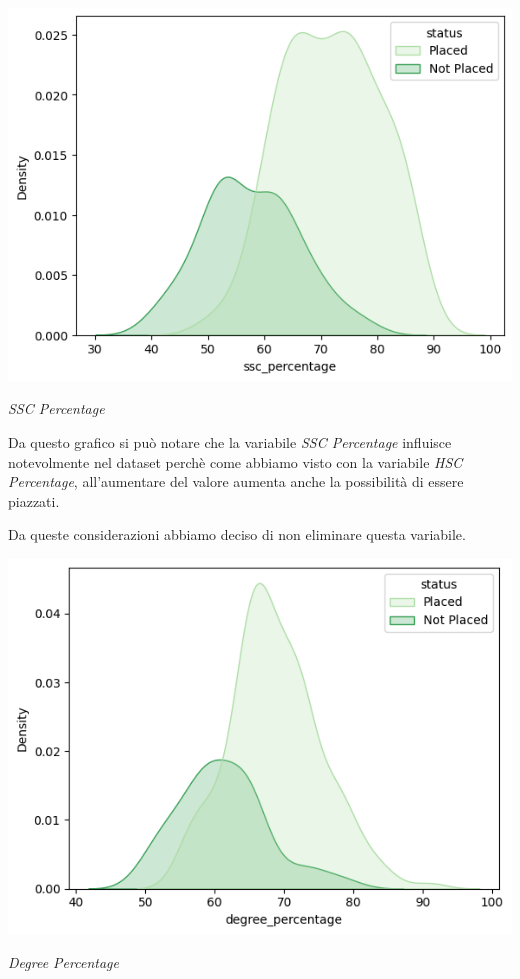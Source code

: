 \documentclass[12pt]{article}
\begin{document}
\begin{center}
    \includegraphics[scale=0.5]{sscpercentage.png}

    \textit{SSC Percentage}
\end{center}

Da questo grafico si può notare che la variabile \textit{SSC Percentage} influisce notevolmente nel dataset perchè come abbiamo visto con la 
variabile \textit{HSC Percentage}, all'aumentare del valore aumenta anche la possibilità di essere piazzati.

Da queste considerazioni abbiamo deciso di non eliminare questa variabile.

\begin{center}
    \includegraphics[scale=0.5]{degreepercentage.png}

    \textit{Degree Percentage}
\end{center}
\end{document}
